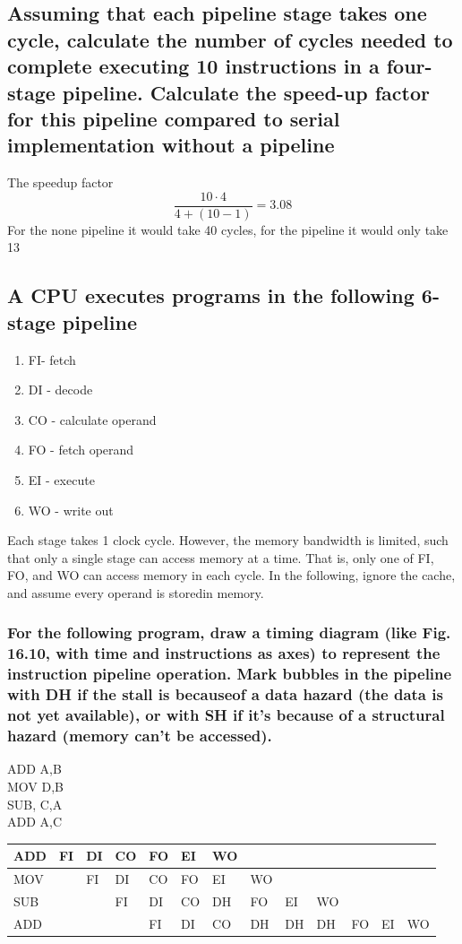 \documentclass[12pt, a4paper]{article}
\begin{document}
		\subsection{Assuming that each pipeline stage takes one cycle, calculate the number of cycles needed to complete executing 10 instructions in a four-stage pipeline. Calculate the speed-up factor for this pipeline compared to serial implementation without a pipeline}
			The speedup factor 
			$$\frac{10\cdot 4}{4+(10-1)}=3.08$$ 
			For the none pipeline it would take 40 cycles, for the pipeline it would only take 13
		\subsection{A CPU executes programs in the following 6-stage pipeline}
			\begin{enumerate}
				\item FI- fetch
				\item DI - decode
				\item CO - calculate operand
				\item FO - fetch operand
				\item EI - execute
				\item WO - write out
			\end{enumerate}
			Each stage takes 1 clock cycle. However, the memory bandwidth is limited, such that only a single stage can access memory at a time. That is, only one of FI, FO, and WO can access memory in each cycle. In the following, ignore the cache, and assume every operand is storedin memory.
			\subsubsection{For the following program, draw a timing diagram (like Fig. 16.10, with time and instructions as axes) to represent the instruction pipeline operation. Mark bubbles in the pipeline with DH if the stall is becauseof a data hazard (the data is not yet available), or with SH if it’s because of a structural hazard (memory can’t be accessed).}
				ADD A,B\\
				MOV D,B\\
				SUB, C,A\\
				ADD A,C\\
\begin{table}[h!]
\begin{tabular}{|l|l|l|l|l|l|l|l|l|l|l|l|l|}
\hline
ADD & FI & DI & CO & FO & EI & WO &    &    &    &    &    &    \\ \hline
MOV &    & FI & DI & CO & FO & EI & WO &    &    &    &    &    \\ \hline
SUB &    &    & FI & DI & CO & DH & FO & EI & WO &    &    &    \\ \hline
ADD &    &    &    & FI & DI & CO & DH & DH & DH & FO & EI & WO \\ \hline
\end{tabular}
\end{table}
\end{document}
